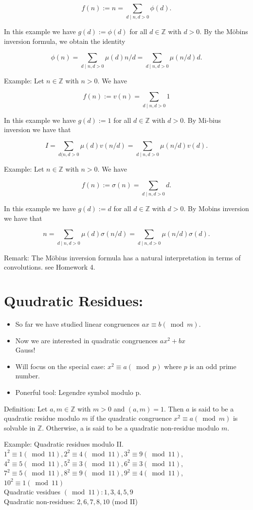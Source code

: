 \documentclass[10pt]{article}
\begin{document}
$$
f(n):=n=\sum_{d \mid n, d>0} \phi(d) .
$$

In this example we have $g(d):=\phi(d)$ for all $d \in \mathbb{Z}$ with $d>0$. By the Möbins inversion formula, we obtain the identity

$$
\phi(n)=\sum_{d \mid n, d>0} \mu(d) n / d=\sum_{d \mid n, d>0} \mu(n / d) d .
$$

Example: Let $n \in \mathbb{Z}$ with $n>0$. We have

$$
f(n):=v(n)=\sum_{d \mid n, d>0} 1
$$

In this example we have $g(d):=1$ for all $d \in \mathbb{Z}$ with $d>0$. By Mi-bius inversion we have that

$$
I=\sum_{d(n, d>0} \mu(d) v(n / d)=\sum_{d \mid n, d>0} \mu(n / d) v(d) .
$$

Example: Let $n \in \mathbb{Z}$ with $n>0$. We have

$$
f(n):=\sigma(n)=\sum_{d \mid n, d>0} d .
$$

In this example we have $g(d):=d$ for all $d \in \mathbb{Z}$ with $d>0$. By Mobins inversion we have that

$$
n=\sum_{d \mid n, d>0} \mu(d) \sigma(n / d)=\sum_{d \mid n, d>0} \mu(n / d) \sigma(d) .
$$

Remark: The Möbius inversion formula has a natural interpretation in terms of convolutions. see Homework 4.

\section*{Quudratic Residues:}
\begin{itemize}
  \item So far we have studied linear congruences $a x \equiv b(\bmod m)$.
  \item Now we are interested in quadratic congruences $a x^{2}+b x$\\
Gauss!
  \item Will focus on the special case: $x^{2} \equiv a(\bmod p)$ where $p$ is an odd prime number.
  \item Ponerful tool: Legendre symbol modulo p.
\end{itemize}

Definition: Let $a, m \in \mathbb{Z}$ with $m>0$ and $(a, m)=1$. Then $a$ is said to be a quadratic residue modulo $m$ if the quadratic congruence $x^{2} \equiv a(\bmod m)$ is solvable in $\mathbb{Z}$. Otherwise, a is said to be a quadratic non-residue modulo $m$.

Example: Quadratic residues modulo II.\\
$1^{2} \equiv 1(\bmod 11), 2^{2} \equiv 4(\bmod 11), 3^{2} \equiv 9(\bmod 11)$,\\
$4^{2} \equiv 5(\bmod 11), 5^{2} \equiv 3(\bmod 11), 6^{2} \equiv 3(\bmod 11)$,\\
$7^{2} \equiv 5(\bmod 11), 8^{2} \equiv 9(\bmod 11), 9^{2} \equiv 4(\bmod 11)$,\\
$10^{2} \equiv 1(\bmod 11)$\\
Quadratic vesidues $(\bmod 11): 1,3,4,5,9$\\
Quadratic non-residues: $2,6,7,8,10$ (mod II)
\end{document}
